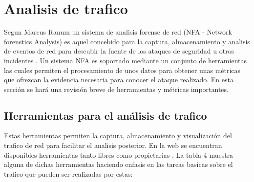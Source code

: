 \documentclass[12pt]{article}
\begin{document}
\section{Analisis de trafico} 

Segun Marcus Ranum un sistema de analisis forense de red (NFA - Network forenstics Analysis) es aquel concebido para la captura, almacenamiento y analisis de eventos de red para descubir la fuente de los ataques de seguridad u otros incidentes \citep{marcus_ranum}. Un sistema NFA es soportado mediante un conjunto de herramientas las cuales permiten el procesamiento de unos datos para obtener unas métricas que ofrezcan la evidencia necesaria para conocer el ataque realizado. En esta sección se hará una revisión breve de herramientas y métricas importantes.

\subsection{Herramientas para el análisis de trafico}

Estas herramientas permiten la captura, almacenamiento y visualización del trafico de red para facilitar el analisis posterior. En la web se encuentran disponibles herramientas tanto libres como propietarias \citep{forensics_kiki,net_forenstics}. La tabla 4 muestra alguna de dichas herramientas haciendo enfasis en las tareas basicas sobre el trafico que pueden ser realizadas por estas:
\end{document}
